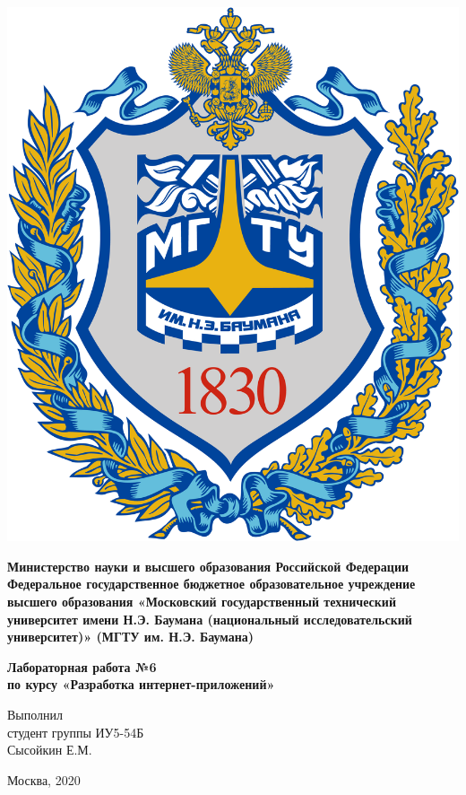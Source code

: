 \documentclass[20pt,a4paper]{report}
\begin{document}
	\begin{titlepage}
		\begin{minipage}{0.3\textwidth}
		\includegraphics[scale=0.03]{logo.png}	
		\end{minipage}
		\begin{minipage}{0.6\textwidth}\centering
			\textbf{
				Министерство науки и высшего образования Российской Федерации
				Федеральное государственное бюджетное образовательное 
				учреждение высшего образования
				«Московский государственный технический университет
				имени Н.Э. Баумана (национальный исследовательский университет)»
				(МГТУ им. Н.Э. Баумана)
			}	
		\end{minipage}
	
		\vspace{5cm}
		\centering
		\Large
		\textbf{
			Лабораторная работа №6 \\
			по курсу «Разработка интернет-приложений» \\
		}

		\vspace{6cm}
		\begin{flushright}
			Выполнил \\ 
			студент группы ИУ5-54Б \\ 
			Сысойкин Е.М. 
		\end{flushright}
		\vspace{5cm}
		Москва, 2020
	\end{titlepage}
\end{document}
